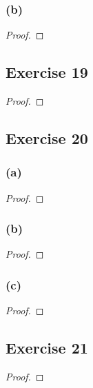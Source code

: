 \documentclass[14pt]{extarticle}
\begin{document}
\subsubsection{(b)}

\begin{proof}

\end{proof}

\subsection{Exercise 19}

\begin{proof}

\end{proof}

\subsection{Exercise 20}

\subsubsection{(a)}

\begin{proof}

\end{proof}

\subsubsection{(b)}

\begin{proof}

\end{proof}

\subsubsection{(c)}

\begin{proof}

\end{proof}

\subsection{Exercise 21}

\begin{proof}

\end{proof}
\end{document}
